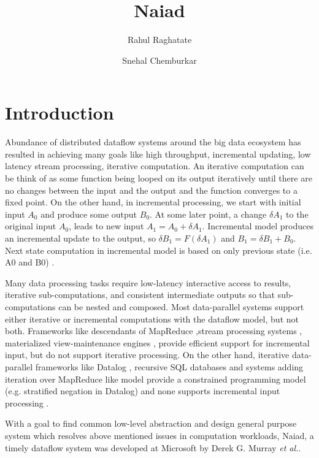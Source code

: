 \documentclass[9pt,twocolumn,twoside]{../../styles/osajnl}
\title{Naiad}
\author[1,*]{Rahul Raghatate}
\author[1]{Snehal Chemburkar}
\affil[1]{School of Informatics and Computing, Bloomington, IN 47408,
  U.S.A.}
\affil[*]{Corresponding authors: rragahta@iu.edu, snehchem@iu.edu }
\begin{document}
\maketitle

\section{Introduction}

Abundance of distributed dataflow systems around the big data
ecosystem has resulted in achieving many goals like high throughput,
incremental updating, low latency stream processing, iterative
computation. An iterative computation can be think of as some function
being looped on its output iteratively until there are no changes
between the input and the output and the function converges to a fixed
point. On the other hand, in incremental processing, we start with
initial input $A_{0}$ and produce some output $B_0$. At some later
point, a change $\delta A_1$ to the original input $A_0$, leads to new
input $A_1 = A_0 + \delta A_1$. Incremental model produces an
incremental update to the output, so $\delta B_1 = F(\delta A_1)$ and
$B_1 = \delta B_1 + B_0$. Next state computation in incremental model
is based on only previous state (i.e. A0 and B0)
\cite{www-blog-naiad-summary}.

Many data processing tasks require low-latency interactive access to
results, iterative sub-computations, and consistent intermediate
outputs so that sub-computations can be nested and composed. Most
data-parallel systems support either iterative or incremental
computations with the dataflow model, but not both. Frameworks like
descendants of MapReduce \cite{paper-incoop,paper-nectar},stream
processing systems \cite{eventstream,paper-spade}, materialized
view-maintenance engines \cite{paper-maintainance}, provide efficient
support for incremental input, but do not support iterative
processing. On the other hand, iterative data-parallel frameworks like
Datalog \cite{paper-datalog}, recursive SQL databases \cite{paper-SQL}
and systems adding iteration over MapReduce like model
\cite{paper-haloop,paper-twister,paper-ceil,paper-RDD} provide a
constrained programming model (e.g. stratified negation in Datalog)
and none supports incremental input processing \cite{paper2-Naiad}.

With a goal to find common low-level abstraction and design general
purpose system which resolves above mentioned issues in computation
workloads, Naiad, a timely dataflow system was developed at Microsoft
by Derek G. Murray \textit{et al.}.
\end{document}
